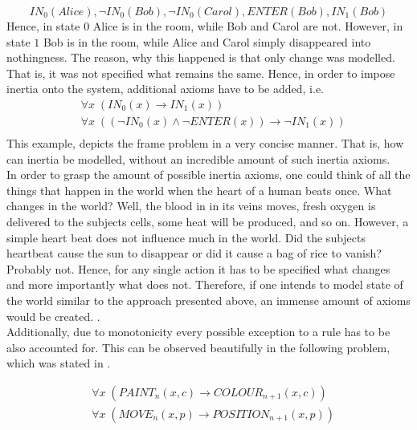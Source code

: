 \documentclass{article}
\begin{document}
\begin{equation*}
IN_{0}(Alice), \neg IN_{0}(Bob),  \neg IN_{0}(Carol), ENTER(Bob), IN_{1}(Bob)
\end{equation*}
Hence, in state $0$ Alice is in the room, while Bob and Carol are not. However, in state $1$ Bob is in the room, while Alice and Carol simply disappeared into nothingness.
The reason, why this happened is that only change was modelled. That is, it was not specified what remains the same. Hence, in order to impose inertia onto the system, additional axioms have to be added, i.e.
\begin{equation*}
\begin{split}
&\forall x \; (IN_{0}(x) \to IN_{1}(x)) \\
&\forall x \; ((\neg IN_{0}(x) \wedge \neg ENTER(x)) \to \neg IN_{1}(x)) \\
\end{split}
\end{equation*}
This example, depicts the frame problem in a very concise manner. That is, how can inertia be modelled, without an incredible amount of such inertia axioms. \\
In order to grasp the amount of possible inertia axioms, one could think of all the things that happen in the world when the heart of a human beats once. What changes in the world? Well, the blood in in its veins moves, fresh oxygen is delivered to the subjects cells, some heat will be produced, and so on. However, a simple heart beat does not influence much in the world. Did the subjects heartbeat cause the sun to disappear or did it cause a bag of rice to vanish? Probably not. Hence, for any single action it has to be specified what changes and more importantly what does not. Therefore, if one intends to model state of the world similar to the approach presented above, an immense amount of axioms would be created. \cite{lifschitz2015dramatic,BOCHMAN2007557}. \\
Additionally, due to monotonicity every possible exception to a rule has to be also accounted for. This can be observed beautifully in the following problem, which was stated in \cite{stanford2016frame}. 

\begin{equation*}
\begin{split}
&\forall x \; (PAINT_{n}(x,c) \to COLOUR_{n+1}(x,c)) \\
&\forall x \; (MOVE_{n}(x,p) \to POSITION_{n+1}(x,p)) \\
\end{split}
\end{equation*}
\end{document}
